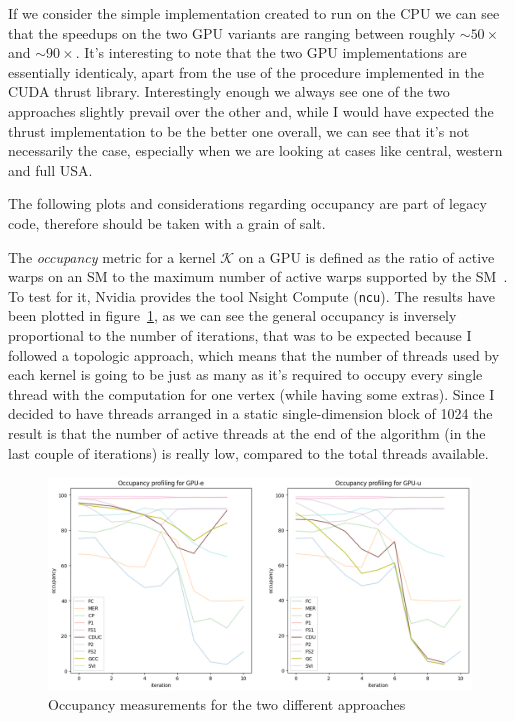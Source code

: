 \documentclass[a4paper,10pt]{article}
\begin{document}
If we consider the simple \brka implementation created to run on the CPU we can see that the
speedups on the two GPU variants are ranging between roughly $\sim50\times$ and $\sim90\times$. It's
interesting to note that the two GPU implementations are essentially identicaly, apart from the use
of the  procedure implemented in the CUDA thrust library. Interestingly
enough we always see one of the two approaches slightly prevail over the other and, while I would
have expected the thrust implementation to be the better one overall, we can see that it's not
necessarily the case, especially when we are looking at cases like central, western and full USA.

\medskip

The following plots and considerations regarding occupancy are part of legacy code, therefore should
be taken with a grain of salt.

\medskip

The \emph{occupancy} metric for a kernel $\mathcal{K}$ on a GPU is defined as the ratio of active
warps on an SM to the maximum number of active warps supported by the SM~\cite{def-occupancy}. To
test for it, Nvidia provides the tool Nsight Compute (\texttt{ncu}). The results have been plotted
in figure~\ref{fig:occupancy}, as we can see the general occupancy is inversely proportional to the
number of iterations, that was to be expected because I followed a topologic approach, which means
that the number of threads used by each kernel is going to be just as many as it's required to
occupy every single thread with the computation for one vertex (while having some extras). Since I
decided to have threads arranged in a static single-dimension block of 1024 the result is that the
number of active threads at the end of the algorithm (in the last couple of iterations) is really
low, compared to the total threads available.
\begin{figure}[!h]
	\centering
	\includegraphics[scale=0.5]{fig/occupancy.png}
	\caption{Occupancy measurements for the two different approaches}
	\label{fig:occupancy}
\end{figure}
\end{document}
